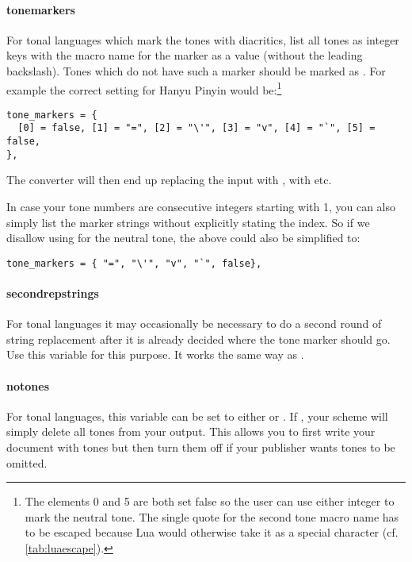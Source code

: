 \documentclass{ltxdockit}
\begin{document}
\paragraph{tone\textunderscore{}markers}

For tonal languages which mark the tones with diacritics, list all tones as
integer keys with the macro name for the marker as a value (without the
leading backslash). Tones which do not have such a marker should be marked as
. For example the correct setting for Hanyu Pinyin would
be:\footnote{The elements 0 and 5 are both set false so the user can use either
integer to mark the neutral tone. The single quote for the second tone macro
name has to be escaped because Lua would otherwise take it as a special
character (cf. \autoref{tab:luaescape}).}

\begin{lstlisting}
tone_markers = {
  [0] = false, [1] = "=", [2] = "\'", [3] = "v", [4] = "`", [5] = false,
},
\end{lstlisting}

The converter will then end up replacing the input  with
,  with  etc.

In case your tone numbers are consecutive integers starting with 1, you can also
simply list the marker strings without explicitly stating the index. So if we
disallow using  for the neutral tone, the above could also be simplified
to:

\begin{lstlisting}
tone_markers = { "=", "\'", "v", "`", false},
\end{lstlisting}

\paragraph{second\textunderscore{}rep\textunderscore{}strings}

For tonal languages it may occasionally be necessary to do a second round of
string replacement after it is already decided where the tone marker should go.
Use this variable for this purpose. It works the same way as
.

\paragraph{no\textunderscore{}tones}

For tonal languages, this variable can be set to either  or
. If , your scheme will simply delete all tones from your
output. This allows you to first write your document with tones but then turn
them off if your publisher wants tones to be omitted.
\end{document}
